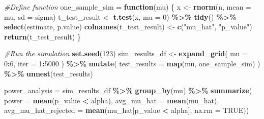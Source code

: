 \documentclass[
]{article}
\newenvironment{Shaded}{\begin{snugshade}}{\end{snugshade}}
\newcommand{\AttributeTok}[1]{\textcolor[rgb]{0.13,0.29,0.53}{#1}}
\newcommand{\CommentTok}[1]{\textcolor[rgb]{0.56,0.35,0.01}{\textit{#1}}}
\newcommand{\ConstantTok}[1]{\textcolor[rgb]{0.56,0.35,0.01}{#1}}
\newcommand{\ControlFlowTok}[1]{\textcolor[rgb]{0.13,0.29,0.53}{\textbf{#1}}}
\newcommand{\DecValTok}[1]{\textcolor[rgb]{0.00,0.00,0.81}{#1}}
\newcommand{\FunctionTok}[1]{\textcolor[rgb]{0.13,0.29,0.53}{\textbf{#1}}}
\newcommand{\NormalTok}[1]{#1}
\newcommand{\OtherTok}[1]{\textcolor[rgb]{0.56,0.35,0.01}{#1}}
\newcommand{\SpecialCharTok}[1]{\textcolor[rgb]{0.81,0.36,0.00}{\textbf{#1}}}
\newcommand{\StringTok}[1]{\textcolor[rgb]{0.31,0.60,0.02}{#1}}
\begin{document}
\begin{Shaded}
\begin{Highlighting}[]
\CommentTok{\#Define function}
\NormalTok{one\_sample\_sim }\OtherTok{=} \ControlFlowTok{function}\NormalTok{(mu) \{}
\NormalTok{  x }\OtherTok{\textless{}{-}} \FunctionTok{rnorm}\NormalTok{(n, }\AttributeTok{mean =}\NormalTok{ mu, }\AttributeTok{sd =}\NormalTok{ sigma)}
\NormalTok{  t\_test\_result }\OtherTok{\textless{}{-}} \FunctionTok{t.test}\NormalTok{(x, }\AttributeTok{mu =} \DecValTok{0}\NormalTok{) }\SpecialCharTok{\%\textgreater{}\%} 
    \FunctionTok{tidy}\NormalTok{() }\SpecialCharTok{\%\textgreater{}\%} 
    \FunctionTok{select}\NormalTok{(estimate, p.value)  }
  \FunctionTok{colnames}\NormalTok{(t\_test\_result) }\OtherTok{\textless{}{-}} \FunctionTok{c}\NormalTok{(}\StringTok{"mu\_hat"}\NormalTok{, }\StringTok{"p\_value"}\NormalTok{)}
  \FunctionTok{return}\NormalTok{(t\_test\_result)}
\NormalTok{\}}
\end{Highlighting}
\end{Shaded}

\begin{Shaded}
\begin{Highlighting}[]
\CommentTok{\#Run the simulation}
\FunctionTok{set.seed}\NormalTok{(}\DecValTok{123}\NormalTok{) }
\NormalTok{sim\_results\_df }\OtherTok{\textless{}{-}} \FunctionTok{expand\_grid}\NormalTok{(}
  \AttributeTok{mu =} \DecValTok{0}\SpecialCharTok{:}\DecValTok{6}\NormalTok{,}
  \AttributeTok{iter =} \DecValTok{1}\SpecialCharTok{:}\DecValTok{5000}
\NormalTok{) }\SpecialCharTok{\%\textgreater{}\%}
  \FunctionTok{mutate}\NormalTok{(}
    \AttributeTok{test\_results =} \FunctionTok{map}\NormalTok{(mu, one\_sample\_sim)}
\NormalTok{  ) }\SpecialCharTok{\%\textgreater{}\%}
  \FunctionTok{unnest}\NormalTok{(test\_results)}
\end{Highlighting}
\end{Shaded}

\begin{Shaded}
\begin{Highlighting}[]
\NormalTok{power\_analysis }\OtherTok{=}\NormalTok{ sim\_results\_df }\SpecialCharTok{\%\textgreater{}\%}
  \FunctionTok{group\_by}\NormalTok{(mu) }\SpecialCharTok{\%\textgreater{}\%}
  \FunctionTok{summarize}\NormalTok{(}
    \AttributeTok{power =} \FunctionTok{mean}\NormalTok{(p\_value }\SpecialCharTok{\textless{}}\NormalTok{ alpha),}
    \AttributeTok{avg\_mu\_hat =} \FunctionTok{mean}\NormalTok{(mu\_hat),             }
    \AttributeTok{avg\_mu\_hat\_rejected =} \FunctionTok{mean}\NormalTok{(mu\_hat[p\_value }\SpecialCharTok{\textless{}}\NormalTok{ alpha], }\AttributeTok{na.rm =} \ConstantTok{TRUE}\NormalTok{))}
\end{Highlighting}
\end{Shaded}
\end{document}
